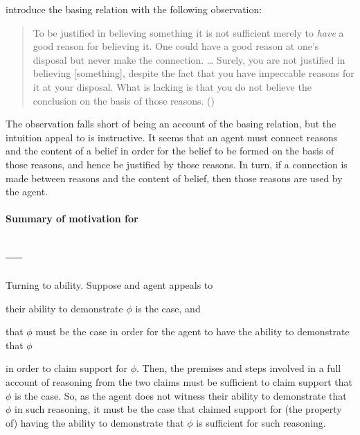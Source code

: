 \begin{note}
  \citeauthor{Pollock:1999tm} introduce the basing relation with the following observation:
  \begin{quote}
    To be justified in believing something it is not sufficient merely to \emph{have} a good reason for believing it.
    One could have a good reason at one's disposal but never make the connection.
    \dots
    Surely, you are not justified in believing [something], despite the fact that you have impeccable reasons for it at your disposal.
    What is lacking is that you do not believe the conclusion on the basis of those reasons.\linebreak
    \mbox{}\hfill\mbox{(\Citeyear[35]{Pollock:1999tm})}
  \end{quote}
  The observation falls short of being an account of the basing relation, but the intuition \citeauthor{Pollock:1999tm} appeal to is instructive.
  It seems that an agent must connect reasons and the content of a belief in order for the belief to be formed on the basis of those reasons, and hence be justified by those reasons.
  In turn, if a connection is made between reasons and the content of belief, then those reasons are used by the agent.
\end{note}


\paragraph{Summary of motivation for \ESU{}}

\subsection{ --- \EAS{}}
\label{sec:eas}

\begin{note}
  Turning to ability.
  Suppose and agent appeals to
  \begin{enumerate*}
  \item their ability to demonstrate \(\phi\) is the case, and
  \item that \(\phi\) must be the case in order for the agent to have the ability to demonstrate that \(\phi\)
  \end{enumerate*}
  in order to claim support for \(\phi\).
  Then, the premises and steps involved in a full account of reasoning from the two claims must be sufficient to claim support that \(\phi\) is the case.
  So, as the agent does not witness their ability to demonstrate that \(\phi\) in such reasoning, it must be the case that claimed support for (the property of) having the ability to demonstrate that \(\phi\) is sufficient for such reasoning.
\end{note}


